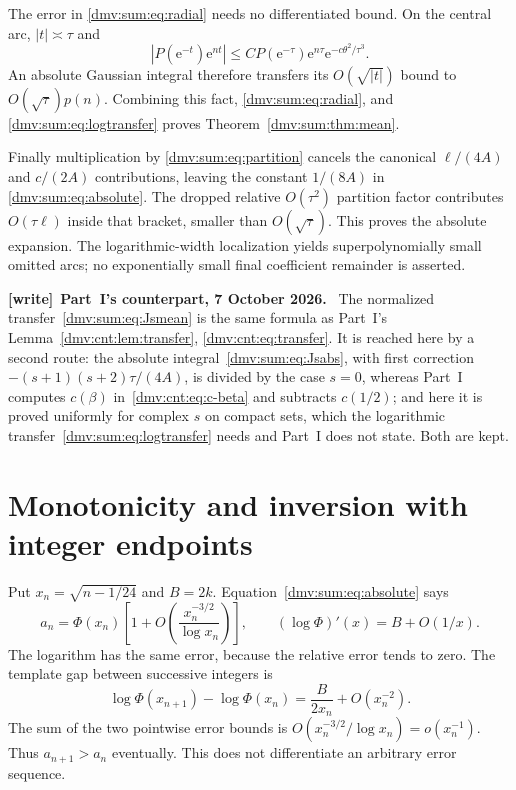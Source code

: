\documentclass[11pt,letterpaper]{article}
\numberwithin{equation}{section}
\theoremstyle{definition}\newtheorem{definition}[theorem]{Definition}
\theoremstyle{remark}\newtheorem{remark}[theorem]{Remark}
\newcommand{\ee}{\mathrm e}
\newenvironment{writenote}[1][]{\par\smallskip\begingroup\small
 \noindent\textbf{[write]}\if\relax\detokenize{#1}\relax\else~\textbf{#1.}\fi\ }%
 {\par\endgroup\smallskip}
\begin{document}
The error in \eqref{dmv:sum:eq:radial} needs no differentiated bound. On the central arc, $|t|\asymp\tau$ and
\[
 |P(\ee^{-t})\ee^{nt}|\le CP(\ee^{-\tau})\ee^{n\tau}
                                  \ee^{-c\theta^2/\tau^3}.
\]
An absolute Gaussian integral therefore transfers its $O(\sqrt{|t|})$ bound to $O(\sqrt\tau)p(n)$. Combining this fact, \eqref{dmv:sum:eq:radial}, and \eqref{dmv:sum:eq:logtransfer} proves Theorem~\ref{dmv:sum:thm:mean}.

Finally multiplication by \eqref{dmv:sum:eq:partition} cancels the canonical $\ell/(4A)$ and $c/(2A)$ contributions, leaving the constant $1/(8A)$ in \eqref{dmv:sum:eq:absolute}. The dropped relative $O(\tau^2)$ partition factor contributes $O(\tau\ell)$ inside that bracket, smaller than $O(\sqrt\tau)$. This proves the absolute expansion. The logarithmic-width localization yields superpolynomially small omitted arcs; no exponentially small final coefficient remainder is asserted.

\begin{writenote}[Part~I's counterpart, 7 October 2026]
The normalized transfer~\eqref{dmv:sum:eq:Jsmean} is the same formula as
Part~I's Lemma~\ref{dmv:cnt:lem:transfer}, \eqref{dmv:cnt:eq:transfer}. It is
reached here by a second route: the absolute integral~\eqref{dmv:sum:eq:Jsabs},
with first correction $-(s+1)(s+2)\tau/(4A)$, is divided by the case $s=0$,
whereas Part~I computes $c(\beta)$ in~\eqref{dmv:cnt:eq:c-beta} and subtracts
$c(1/2)$; and here it is proved uniformly for complex $s$ on compact sets,
which the logarithmic transfer~\eqref{dmv:sum:eq:logtransfer} needs and
Part~I does not state. Both are kept.
\end{writenote}

\section{Monotonicity and inversion with integer endpoints}\label{dmv:sum:sec:inverse}
Put $x_n=\sqrt{n-1/24}$ and $B=2k$. Equation~\eqref{dmv:sum:eq:absolute} says
\begin{equation}\label{dmv:sum:eq:relative}
 a_n=\Phi(x_n)\left[1+O\!\left(\frac{x_n^{-3/2}}{\log x_n}\right)\right],
 \qquad (\log\Phi)'(x)=B+O(1/x).
\end{equation}
The logarithm has the same error, because the relative error tends to zero. The template gap between successive integers is
\[
 \log\Phi(x_{n+1})-\log\Phi(x_n)=\frac B{2x_n}+O(x_n^{-2}).
\]
The sum of the two pointwise error bounds is $O(x_n^{-3/2}/\log x_n)=o(x_n^{-1})$. Thus $a_{n+1}>a_n$ eventually. This does not differentiate an arbitrary error sequence.
\end{document}
